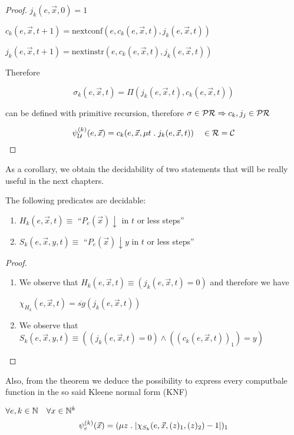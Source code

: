 \begin{theorem}
\begin{proof}
  $j_k(e, \vec{x}, 0) = 1$

  $c_k(e, \vec{x}, t+1) = \mbox{nextconf} (e, c_k(e, \vec{x}, t), j_k(e,\vec{x},t))$

  $j_k(e, \vec{x}, t+1) = \mbox{nextinstr} (e, c_k(e, \vec{x}, t), j_k(e,\vec{x},t))$

  Therefore

  \[
    \sigma_k(e,\vec{x},t) = \Pi(j_k(e,\vec{x},t), c_k(e,\vec{x},t))
  \]

  can be defined with primitive recursion, therefore $\sigma \in \mathcal{PR} \Rightarrow c_k, j_j \in \mathcal{PR}$

  \[
    \psi_{\mathcal{U}}^{(k)} (e, \vec{x}) = c_k(e, \vec{x}, \mu t \; . \; j_k(e,\vec{x},t)) \quad \in \mathcal{R} = \mathcal{C}
  \]
  \end{proof}
\end{theorem}

As a corollary, we obtain the decidability of two statements that will
be really useful in the next chapters.

\begin{corollary}
  The following predicates are decidable:
  \begin{enumerate}[label=(\alph*)]
  \item $H_k(e, \vec{x}, t) \equiv$ ``$P_e(\vec{x})\downarrow$ in $t$
    or less steps''
  \item $S_k(e, \vec{x}, y, t) \equiv$ ``$P_e(\vec{x})\downarrow y$ in
    $t$ or less steps''
  \end{enumerate}
  \begin{proof}
    \begin{enumerate}[label=(\alph*)]
    \item We observe that
      $H_k(e, \vec{x}, t) \equiv (j_k(e,\vec{x}, t) = 0)$ and therefore
      we have
      
      $\chi_{H_k}(e, \vec{x}, t) = \overline{sg}(j_k(e,\vec{x},t))$
    \item We observe that
      $S_k(e, \vec{x}, y, t) \equiv ((j_k(e,\vec{x},t) = 0) \wedge ((c_k(e,\vec{x},t))_1)=y)$
    \end{enumerate}
  \end{proof}
\end{corollary}

Also, from the theorem we deduce the possibility to express every
computbale function in the so said Kleene normal form (KNF)

\begin{corollary}
  $\forall e,k \in \mathbb{N} \quad \forall x \in \mathbb{N}^k$
  \[
    \psi_e^{(k)} (\vec{x}) = (\mu z \;.\; |\chi_{S_k}(e, \vec{x}, (z)_1, (z)_2) - 1|)_1
  \]
\end{corollary}

